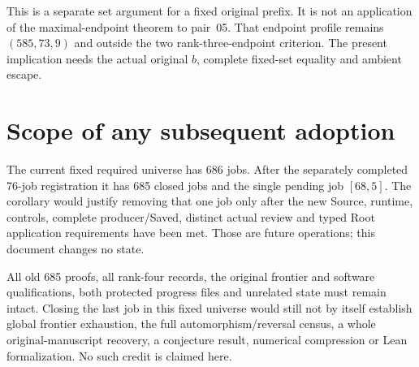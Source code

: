 \documentclass[11pt]{article}
\begin{document}
This is a separate set argument for a fixed original prefix. It is
not an application of the maximal-endpoint theorem to pair~05.
That endpoint profile remains $(585,73,9)$ and outside the two
rank-three-endpoint criterion. The present implication needs the
actual original $b$, complete fixed-set equality and ambient escape.

\section{Scope of any subsequent adoption}

The current fixed required universe has 686 jobs. After the separately
completed 76-job registration it has 685 closed jobs and the single
pending job $[68,5]$. The corollary would justify removing that
one job only after the new Source, runtime, controls, complete
producer/Saved, distinct actual review and typed Root application
requirements have been met. Those are future operations; this
document changes no state.

All old 685 proofs, all rank-four records, the original frontier and
software qualifications, both protected progress files and unrelated
state must remain intact. Closing the last job in this fixed universe
would still not by itself establish global frontier exhaustion, the
full automorphism/reversal census, a whole original-manuscript
recovery, a conjecture result, numerical compression or Lean
formalization. No such credit is claimed here.
\end{document}
